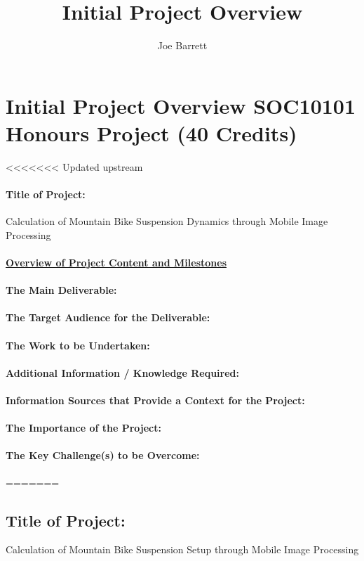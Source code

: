 \documentclass[a4paper, 12pt]{article}
\title{Initial Project Overview}
\author{Joe Barrett}
\begin{document}
	\setcounter{secnumdepth}{-1}
	\section[Heading]{\Large Initial Project Overview
			\newline
			SOC10101 Honours Project (40 Credits)
	}
<<<<<<< Updated upstream
	\paragraph{Title of Project:\newline}
	Calculation of Mountain Bike Suspension Dynamics through Mobile Image Processing
	\paragraph{\underline{Overview of Project Content and Milestones}}
	\paragraph{The Main Deliverable:}
	\paragraph{The Target Audience for the Deliverable:}
	\paragraph{The Work to be Undertaken:}
	\paragraph{Additional Information / Knowledge Required:}
	\paragraph{Information Sources that Provide a Context for the Project:}
	\paragraph{The Importance of the Project:}
	\paragraph{The Key Challenge(s) to be Overcome:}
=======
	
	\subsection[Title]{Title of Project:}
	Calculation of Mountain Bike Suspension Setup through Mobile Image Processing
	
\end{document}
